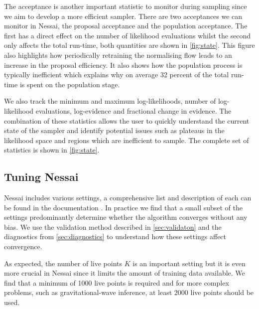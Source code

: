 \documentclass[%
 reprint,
nofootinbib,
 amsmath,amssymb,
 aps,
 prd,
]{revtex4-2}
\newcommand{\nessai}{{\sc Nessai}\xspace}
\begin{document}
The acceptance is another important statistic to monitor during sampling since we aim to develop a more efficient sampler. There are two acceptances we can monitor in \nessai, the proposal acceptance and the population acceptance. The first has a direct effect on the number of likelihood evaluations whilst the second only affects the total run-time, both quantities are shown in \cref{fig:state}. This figure also highlights how periodically retraining the normalising flow leads to an increase in the proposal efficiency. It also shows how the population process is typically inefficient which explains why on average 32 percent of the total run-time is spent on the population stage.

We also track the minimum and maximum log-likelihoods, number of log-likelihood evaluations, log-evidence and fractional change in evidence. The combination of these statistics allows the user to quickly understand the current state of the sampler and identify potential issues such as plateaus in the likelihood space and regions which are inefficient to sample. The complete set of statistics is shown in \cref{fig:state}.

\subsection{Tuning \nessai}\label{sec:tuning}

\nessai includes various settings, a comprehensive list and description of each can be found in the documentation \cite{nessai-docs}. In practice we find that a small subset of the settings predominantly determine whether the algorithm converges without any bias. We use the validation method described in \cref{sec:validaton} and the diagnostics from \cref{sec:diagnostics} to understand how these settings affect convergence.

As expected, the number of live points $K$ is an important setting but it is even more crucial in \nessai since it limits the amount of training data available. We find that a minimum of 1000 live points is required and for more complex problems, such as gravitational-wave inference, at least 2000 live points should be used.
\end{document}
